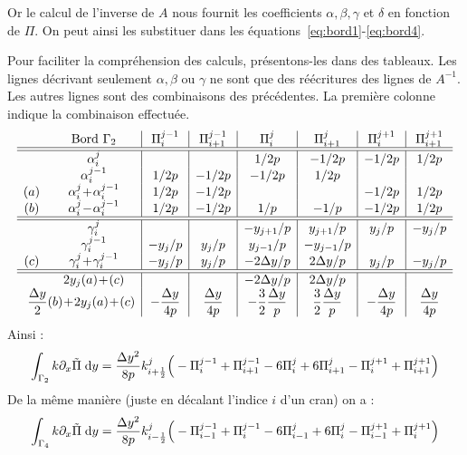 \documentclass[main.tex]{subfiles}
\begin{document}
Or le calcul de l'inverse de $A$ nous fournit les coefficients $\alpha, \beta, \gamma$ et $\delta$ en fonction de $\Pi$. On peut ainsi les substituer dans les équations~\eqref{eq:bord1}-\eqref{eq:bord4}.


Pour faciliter la compréhension des calculs, présentons-les dans des tableaux. 
Les lignes décrivant seulement $\alpha,\beta$ ou $\gamma$ ne sont que des réécritures des lignes de $A^{-1}$. Les autres lignes sont des combinaisons des précédentes. La première colonne indique la combinaison effectuée.
$$\medmuskip=1mu
\begin{array}{cc|c|c|c|c|c|c}
&\textrm{Bord } \Gamma_2  & \Pi_i^{j-1} & \Pi_{i+1}^{j-1} & \Pi_i^j & \Pi_{i+1}^j & \Pi_i^{j+1} & \Pi_{i+1}^{j+1} \\
\hline \hline
 & \alpha_i^j & && 1/2p & -1 /2p & -1 /2p & 1/2p \\
 & \alpha_i^{j-1} & 1 /2p & -1 /2p & -1 /2p & 1/2p && \\
(a) &  \alpha_i^j + \alpha_i^{j-1} & 1 /2p & -1 /2p & &&-1 /2p & 1 /2p \\
(b) &  \alpha_i^j - \alpha_i^{j-1} & 1 /2p & -1 /2p &1/p &-1/p &-1/2p & 1/2p \\
\hline \hline
 &  \gamma_i^j &&& -y_{j+1}/p & y_{j+1}/p &  y_{j}/p & -y_{j}/p \\
 &  \gamma_i^{j-1} & - y_{j}/p & y_{j}/p & y_{j-1}/p & - y_{j-1}/p && \\
(c) & \gamma_i^j + \gamma_i^{j-1} & -y_{j}/p & y_{j}/p & -2 \Delta y/p & 2 \Delta y/p & y_{j}/p & - y_{j}/p \\
\hline \hline
 &  2y_j(a) +(c)  & & & -2 \Delta y/p & 2\Delta y/p & & \\
 & \hspace{-7mm}\dfrac{\Delta y}{2} (b) +2y_j(a) +(c)  & -\dfrac{\Delta y}{4p} & \dfrac{\Delta y}{4p} & -\dfrac{3}{2} \dfrac{\Delta y}{p} & \dfrac{3}{2} \dfrac{\Delta y}{p} & -\dfrac{\Delta y}{4p} & \dfrac{\Delta y}{4p} \\
\end{array}
$$
Ainsi :
\begin{equation}
\int_{\Gamma_2} k \partial_x \tilde{\Pi} \;{\rm d}y  = \frac{\Delta y^2}{8p} k_{i+\frac{1}{2}}^j  \Big(  -\Pi_i^{j-1} + \Pi_{i+1}^{j-1} -6 \Pi_i^j +6 \Pi_{i+1}^j - \Pi_i^{j+1} + \Pi_{i+1}^{j+1} \Big)  \\
\end{equation}
De la même manière (juste en décalant l'indice $i$ d'un cran) on a :
\begin{equation}
\int_{\Gamma_4} k \partial_x \tilde{\Pi} \;{\rm d}y  = \frac{\Delta y^2}{8p} k_{i-\frac{1}{2}}^j  \Big(  -\Pi_{i-1}^{j-1} + \Pi_i^{j-1} -6 \Pi_{i-1}^j +6 \Pi_i^j - \Pi_{i-1}^{j+1} + \Pi_i^{j+1} \Big)  \\
\end{equation}
\end{document}
